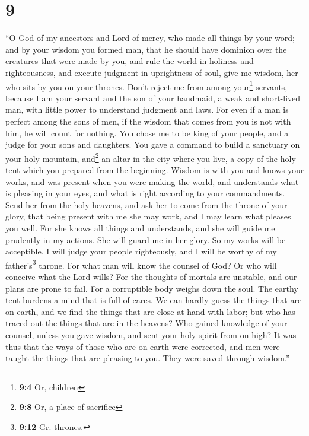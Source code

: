 \hypertarget{section-8}{%
\section{9}\label{section-8}}

 ``O God of my ancestors and Lord of mercy, who made all
things by your word;  and by your wisdom you formed man,
that he should have dominion over the creatures that were made by you,
 and rule the world in holiness and righteousness, and
execute judgment in uprightness of soul,  give me wisdom,
her who sits by you on your thrones. Don't reject me from among
your\footnote{\textbf{9:4} Or, children} servants, 
because I am your servant and the son of your handmaid, a weak and
short-lived man, with little power to understand judgment and laws.
 For even if a man is perfect among the sons of men, if
the wisdom that comes from you is not with him, he will count for
nothing.  You chose me to be king of your people, and a
judge for your sons and daughters.  You gave a command to
build a sanctuary on your holy mountain, and\footnote{\textbf{9:8} Or, a
  place of sacrifice} an altar in the city where you live, a copy of the
holy tent which you prepared from the beginning.  Wisdom
is with you and knows your works, and was present when you were making
the world, and understands what is pleasing in your eyes, and what is
right according to your commandments.  Send her from the
holy heavens, and ask her to come from the throne of your glory, that
being present with me she may work, and I may learn what pleases you
well.  For she knows all things and understands, and she
will guide me prudently in my actions. She will guard me in her glory.
 So my works will be acceptible. I will judge your people
righteously, and I will be worthy of my father's\footnote{\textbf{9:12}
  Gr. thrones.} throne.  For what man will know the
counsel of God? Or who will conceive what the Lord wills?
 For the thoughts of mortals are unstable, and our plans
are prone to fail.  For a corruptible body weighs down
the soul. The earthy tent burdens a mind that is full of cares.
 We can hardly guess the things that are on earth, and we
find the things that are close at hand with labor; but who has traced
out the things that are in the heavens?  Who gained
knowledge of your counsel, unless you gave wisdom, and sent your holy
spirit from on high?  It was thus that the ways of those
who are on earth were corrected, and men were taught the things that are
pleasing to you. They were saved through wisdom.''

